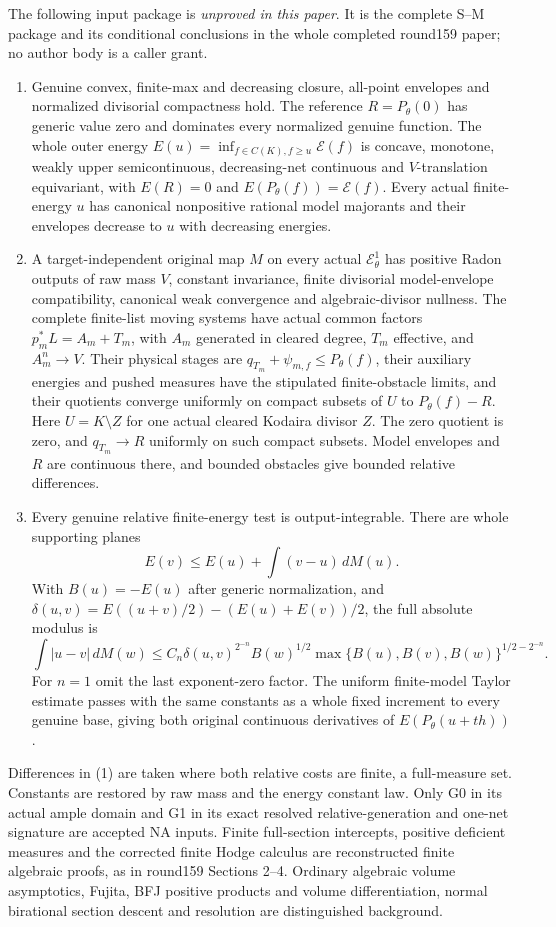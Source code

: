 \documentclass[11pt]{article}
\newcommand{\EE}{\mathcal E^1_\theta}
\begin{document}
The following input package is \emph{unproved in this paper}.
It is the complete S--M package and its conditional conclusions
in the whole completed round159 paper; no author body is a caller grant.
\begin{enumerate}
\item Genuine convex, finite-max and decreasing closure, all-point
envelopes and normalized divisorial compactness hold. The reference
$R=P_\theta(0)$ has generic value zero and dominates every normalized
genuine function. The whole outer energy
$E(u)=\inf_{f\in C(K),f\geq u}\mathscr E(f)$ is concave, monotone,
weakly upper semicontinuous, decreasing-net continuous and
$V$-translation equivariant, with $E(R)=0$ and
$E(P_\theta(f))=\mathscr E(f)$. Every actual finite-energy
$u$ has canonical nonpositive rational model majorants and their
envelopes decrease to $u$ with decreasing energies.
\item A target-independent original map $M$ on every actual $\EE$
has positive Radon outputs of raw mass $V$, constant invariance,
finite divisorial model-envelope compatibility, canonical weak
convergence and algebraic-divisor nullness.
The complete finite-list moving systems have actual common factors
$p_m^*L=A_m+T_m$, with $A_m$ generated in cleared degree,
$T_m$ effective, and $A_m^n\to V$.
Their physical stages are $q_{T_m}+\psi_{m,f}\leq P_\theta(f)$,
their auxiliary energies and pushed measures have the stipulated
finite-obstacle limits, and their quotients converge uniformly
on compact subsets of $U$ to $P_\theta(f)-R$.
Here $U=K\setminus Z$ for one actual cleared Kodaira divisor $Z$.
The zero quotient is zero, and $q_{T_m}\to R$ uniformly on such
compact subsets. Model envelopes and $R$ are continuous there,
and bounded obstacles give bounded relative differences.
\item Every genuine relative finite-energy test is output-integrable.
There are whole supporting planes
\[
 E(v)\leq E(u)+\int(v-u)\,dM(u).
\]
With $B(u)=-E(u)$ after generic normalization, and
$\delta(u,v)=E((u+v)/2)-(E(u)+E(v))/2$, the full absolute modulus is
\[
 \int|u-v|\,dM(w)\leq
 C_n\delta(u,v)^{2^{-n}}B(w)^{1/2}
 \max\{B(u),B(v),B(w)\}^{1/2-2^{-n}}.                    \tag{1}
\]
For $n=1$ omit the last exponent-zero factor.
The uniform finite-model Taylor estimate passes with the same
constants as a whole fixed increment to every genuine base, giving
both original continuous derivatives of $E(P_\theta(u+th))$.
\end{enumerate}
Differences in (1) are taken where both relative costs are finite,
a full-measure set. Constants are restored by raw mass and the
energy constant law.
Only G0 in its actual ample domain and G1 in its exact resolved
relative-generation and one-net signature are accepted NA inputs.
Finite full-section intercepts, positive deficient measures and the
corrected finite Hodge calculus are reconstructed finite algebraic
proofs, as in round159 Sections 2--4.
Ordinary algebraic volume asymptotics, Fujita, BFJ positive products
and volume differentiation, normal birational section descent and
resolution are distinguished background.
\end{document}
